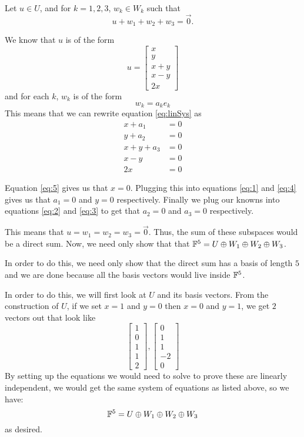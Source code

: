 \documentclass[answers]{exam}
\begin{document}
\begin{questions}
\begin{solution}
        Let $u\in U$, and for $k=1,2,3$, $w_k\in W_k$ such that
        \begin{equation}\label{eq:linSys}
            u + w_1 + w_2 + w_3 = \vec{0}.
        \end{equation}

        We know that $u$ is of the form
        \[
            u = \begin{bmatrix}x\\y\\x+y\\x-y\\2x\end{bmatrix}
        \]
        and for each $k$, $w_k$ is of the form
        \[
            w_k = a_ke_k
        \]
        This means that we can rewrite equation \eqref{eq:linSys} as
        \begin{align}
            x+a_1 &= 0\label{eq:1}\\
            y+a_2 &= 0\label{eq:2}\\
            x+y+a_3 &= 0\label{eq:3}\\
            x-y &= 0\label{eq:4}\\
            2x &= 0\label{eq:5}
        \end{align}

        Equation \eqref{eq:5} gives us that $x=0$. Plugging this into equations \eqref{eq:1} and \eqref{eq:4} gives us that
        $a_1 = 0$ and $y = 0$ respectively. Finally we plug our knowns into equations \eqref{eq:2} and \eqref{eq:3}
        to get that $a_2 = 0$ and $a_3 = 0$ respectively. 

        This means that $u=w_1=w_2=w_3=\vec{0}$. Thus, the sum of these subspaces would be a direct sum. 
        Now, we need only show that that $\mathbb{F}^5 = U\oplus W_1\oplus W_2\oplus W_3$.

        In order to do this, we need only show that the direct sum has a basis of length $5$ and we are done because all the basis vectors would live inside $\mathbb{F}^5$.

        In order to do this, we will first look at $U$ and its basis vectors. From the construction of $U$, if we 
        set $x=1$ and $y=0$ then $x=0$ and $y=1$, we get $2$ vectors out that look like
        \[
            \begin{bmatrix}1\\0\\1\\1\\2\end{bmatrix},\begin{bmatrix}0\\1\\1\\-2\\0\end{bmatrix}
        \]
        By setting up the equations we would need to solve to prove these are linearly independent, we would get
        the same system of equations as listed above, so we have:
        \[
            \mathbb{F}^5 = U\oplus W_1\oplus W_2\oplus W_3
        \]
        as desired.
    \end{solution}


\end{questions}
\end{document}
